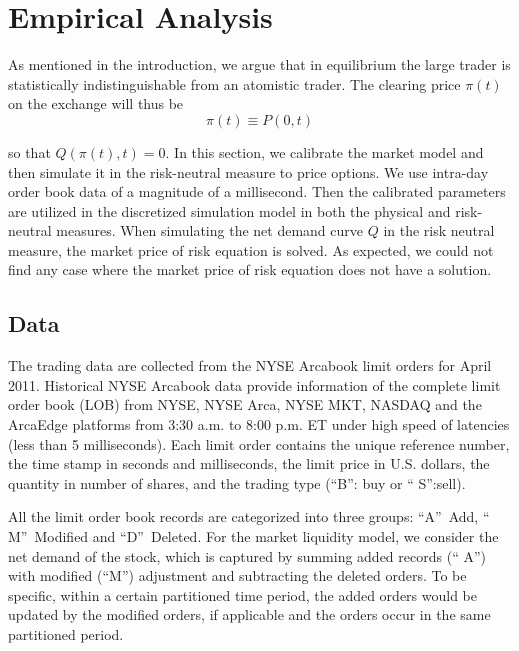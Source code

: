 \documentclass{article}
\begin{document}
\section{Empirical Analysis}

As mentioned in the introduction, we argue that in equilibrium the large
trader is statistically indistinguishable from an atomistic trader. The
clearing price $\pi (t)$ on the exchange will thus be%
\begin{equation*}
\pi (t)\equiv P(0,t)
\end{equation*}

so that $Q(\pi (t),t)=0$. In this section, we calibrate the market model and
then simulate it in the risk-neutral measure to price options. We use intra-day
order book data of a magnitude of a millisecond. Then the
calibrated parameters are utilized in the discretized simulation model in
both the physical and risk-neutral measures. When simulating the net demand
curve $Q$ in the risk neutral measure, the market price of risk equation is
solved. As expected, we could not find any case where the market price of
risk equation does not have a solution.

\subsection{Data}

The trading data are collected from the NYSE Arcabook limit orders for April
2011. Historical NYSE Arcabook data provide information of the complete
limit order book (LOB) from NYSE, NYSE Arca, NYSE MKT, NASDAQ and the
ArcaEdge platforms from 3:30 a.m. to 8:00 p.m. ET under high speed of
latencies (less than 5 milliseconds). Each limit order contains the unique
reference number, the time stamp in seconds and milliseconds, the limit
price in U.S. dollars, the quantity in number of shares, and the trading
type (\textquotedblleft B\textquotedblright : buy or \textquotedblleft
S\textquotedblright :sell).

All the limit order book records are categorized into three groups:
\textquotedblleft A\textquotedblright\ Add, \textquotedblleft
M\textquotedblright\ Modified and \textquotedblleft D\textquotedblright\
Deleted. For the market liquidity model, we consider the net demand of the
stock, which is captured by summing added records (\textquotedblleft
A\textquotedblright ) with modified (\textquotedblleft M\textquotedblright )
adjustment and subtracting the deleted orders. To be specific, within a
certain partitioned time period, the added orders would be updated by the
modified orders, if applicable and the orders occur in the same partitioned
period.
\end{document}
